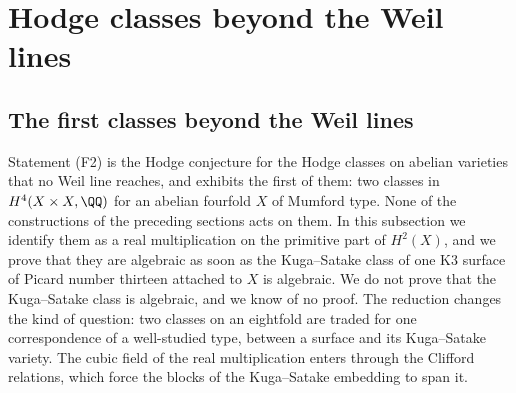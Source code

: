 \section{Hodge classes beyond the Weil lines}\label{sec:beyond}

\subsection{The first classes beyond the Weil lines}\label{ssec:mumford}

Statement (F2) is the Hodge conjecture for the Hodge classes on abelian
varieties that no Weil line reaches, and  exhibits
the first of them: two classes in $H^{4}(X\times X,\QQ)$ for an abelian
fourfold $X$ of Mumford type. None of the constructions of the preceding
sections acts on them. In this subsection we identify them as a real
multiplication on the primitive part of $H^{2}(X)$, and we prove that they
are algebraic as soon as the Kuga--Satake class of one K3 surface of Picard
number thirteen attached to $X$ is algebraic. We do not prove that the
Kuga--Satake class is algebraic, and we know of no proof. The reduction
changes the kind of question: two classes on an eightfold are traded for one
correspondence of a well-studied type, between a surface and its Kuga--Satake
variety. The cubic field of the real multiplication enters through the
Clifford relations, which force the blocks of the Kuga--Satake embedding to
span it.

